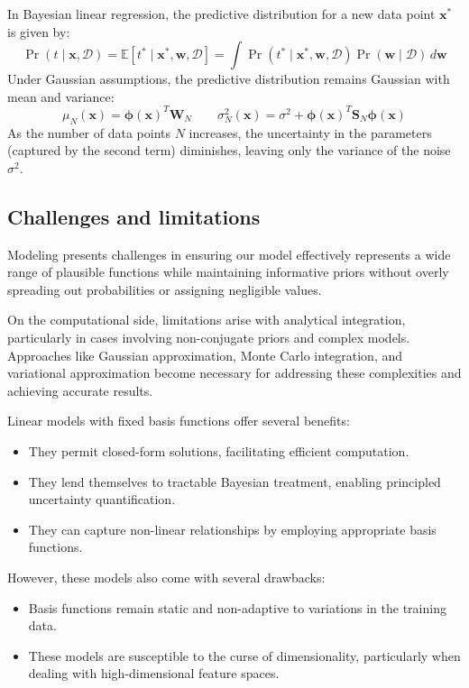 In Bayesian linear regression, the predictive distribution for a new data point $\mathbf{x}^\ast$ is given by:
\[\Pr(t\mid\mathbf{x},\mathcal{D})=\mathbb{E}\left[ t^\ast\mid\mathbf{x}^\ast,\mathbf{w},\mathcal{D} \right] = \int\Pr(t^\ast\mid\mathbf{x}^\ast,\mathbf{w},\mathcal{D})\Pr(\mathbf{w}\mid\mathcal{D})\,d\mathbf{w}\]
Under Gaussian assumptions, the predictive distribution remains Gaussian with mean and variance:
\[\mu_N(\mathbf{x})=\boldsymbol{\phi}(\mathbf{x})^T\mathbf{W}_N \qquad\sigma_N^2(\mathbf{x})=\sigma^2+\boldsymbol{\phi}{(\mathbf{x})}^T\mathbf{S}_N\boldsymbol{\phi}(\mathbf{x})\]
As the number of data points $N$ increases, the uncertainty in the parameters (captured by the second term) diminishes, leaving only the variance of the noise $\sigma^2$. 

\subsection{Challenges and limitations}
Modeling presents challenges in ensuring our model effectively represents a wide range of plausible functions while maintaining informative priors without overly spreading out probabilities or assigning negligible values.

On the computational side, limitations arise with analytical integration, particularly in cases involving non-conjugate priors and complex models. 
Approaches like Gaussian approximation, Monte Carlo integration, and variational approximation become necessary for addressing these complexities and achieving accurate results.

Linear models with fixed basis functions offer several benefits:
\begin{itemize}
    \item They permit closed-form solutions, facilitating efficient computation.
    \item They lend themselves to tractable Bayesian treatment, enabling principled uncertainty quantification.
    \item They can capture non-linear relationships by employing appropriate basis functions.
\end{itemize}
However, these models also come with several drawbacks:
\begin{itemize}
    \item Basis functions remain static and non-adaptive to variations in the training data.
    \item These models are susceptible to the curse of dimensionality, particularly when dealing with high-dimensional feature spaces.
\end{itemize}